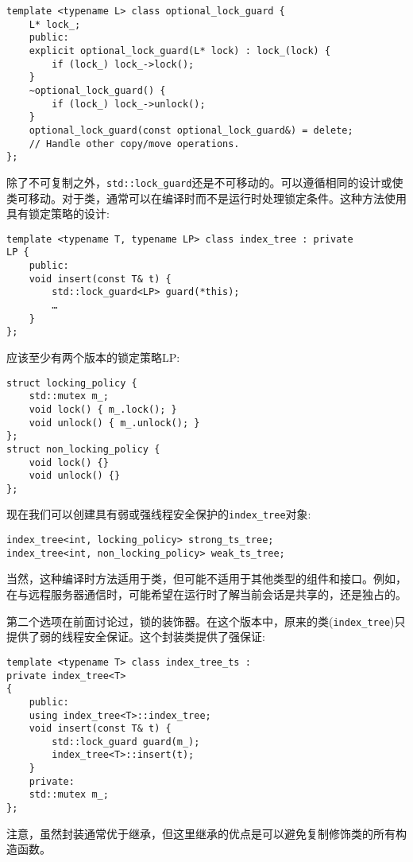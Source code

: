 \begin{lstlisting}[style=styleCXX]
template <typename L> class optional_lock_guard {
	L* lock_;
	public:
	explicit optional_lock_guard(L* lock) : lock_(lock) {
		if (lock_) lock_->lock();
	}
	~optional_lock_guard() {
		if (lock_) lock_->unlock();
	}
	optional_lock_guard(const optional_lock_guard&) = delete;
	// Handle other copy/move operations.
};
\end{lstlisting}

除了不可复制之外，\texttt{std::lock\_guard}还是不可移动的。可以遵循相同的设计或使类可移动。对于类，通常可以在编译时而不是运行时处理锁定条件。这种方法使用具有锁定策略的设计:

\begin{lstlisting}[style=styleCXX]
template <typename T, typename LP> class index_tree : private 
LP {
	public:
	void insert(const T& t) {
		std::lock_guard<LP> guard(*this);
		…
	}
};
\end{lstlisting}

应该至少有两个版本的锁定策略LP:

\begin{lstlisting}[style=styleCXX]
struct locking_policy {
	std::mutex m_;
	void lock() { m_.lock(); }
	void unlock() { m_.unlock(); }
};
struct non_locking_policy {
	void lock() {}
	void unlock() {}
};
\end{lstlisting}

现在我们可以创建具有弱或强线程安全保护的\texttt{index\_tree}对象:

\begin{lstlisting}[style=styleCXX]
index_tree<int, locking_policy> strong_ts_tree;
index_tree<int, non_locking_policy> weak_ts_tree;
\end{lstlisting}

当然，这种编译时方法适用于类，但可能不适用于其他类型的组件和接口。例如，在与远程服务器通信时，可能希望在运行时了解当前会话是共享的，还是独占的。

第二个选项在前面讨论过，锁的装饰器。在这个版本中，原来的类(\texttt{index\_tree})只提供了弱的线程安全保证。这个封装类提供了强保证:

\begin{lstlisting}[style=styleCXX]
template <typename T> class index_tree_ts :
private index_tree<T> 
{
	public:
	using index_tree<T>::index_tree;
	void insert(const T& t) {
		std::lock_guard guard(m_);
		index_tree<T>::insert(t);
	}
	private:
	std::mutex m_;
};
\end{lstlisting}

注意，虽然封装通常优于继承，但这里继承的优点是可以避免复制修饰类的所有构造函数。 

